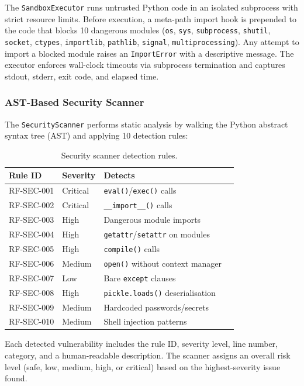 \documentclass[11pt,a4paper]{article}
\begin{document}
The \texttt{SandboxExecutor} runs untrusted Python code in an isolated
subprocess with strict resource limits.  Before execution, a
meta-path import hook is prepended to the code that blocks 10 dangerous
modules (\texttt{os}, \texttt{sys}, \texttt{subprocess},
\texttt{shutil}, \texttt{socket}, \texttt{ctypes}, \texttt{importlib},
\texttt{pathlib}, \texttt{signal}, \texttt{multiprocessing}).  Any
attempt to import a blocked module raises an \texttt{ImportError} with a
descriptive message.  The executor enforces wall-clock timeouts via
subprocess termination and captures stdout, stderr, exit code, and
elapsed time.

\subsubsection{AST-Based Security Scanner}

The \texttt{SecurityScanner} performs static analysis by walking the
Python abstract syntax tree (AST) and applying 10 detection rules:

\begin{table}[h]
\centering
\small
\begin{tabular}{@{}llll@{}}
\toprule
\textbf{Rule ID} & \textbf{Severity} & \textbf{Detects} \\
\midrule
RF-SEC-001 & Critical & \texttt{eval()}/\texttt{exec()} calls \\
RF-SEC-002 & Critical & \texttt{\_\_import\_\_()} calls \\
RF-SEC-003 & High     & Dangerous module imports \\
RF-SEC-004 & High     & \texttt{getattr}/\texttt{setattr} on modules \\
RF-SEC-005 & High     & \texttt{compile()} calls \\
RF-SEC-006 & Medium   & \texttt{open()} without context manager \\
RF-SEC-007 & Low      & Bare \texttt{except} clauses \\
RF-SEC-008 & High     & \texttt{pickle.loads()} deserialisation \\
RF-SEC-009 & Medium   & Hardcoded passwords/secrets \\
RF-SEC-010 & Medium   & Shell injection patterns \\
\bottomrule
\end{tabular}
\caption{Security scanner detection rules.}
\label{tab:secrules}
\end{table}

Each detected vulnerability includes the rule ID, severity level, line
number, category, and a human-readable description.  The scanner assigns
an overall risk level (safe, low, medium, high, or critical) based on the
highest-severity issue found.
\end{document}
